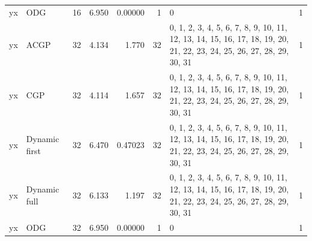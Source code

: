 \documentclass[10pt,a4paper]{article}
\begin{document}
\begin{longtable}{@{}p{23mm}p{29mm}rrrrp{36mm}r@{}}
yx & ODG & 16 & 6.950 & 0.00000 & 1 & 0 & 1 \\
yx & ACGP & 32 & 4.134 & 1.770 & 32 & 0, 1, 2, 3, 4, 5, 6, 7, 8, 9, 10, 11, 12, 13, 14, 15, 16, 17, 18, 19, 20, 21, 22, 23, 24, 25, 26, 27, 28, 29, 30, 31 & 1 \\
yx & CGP & 32 & 4.114 & 1.657 & 32 & 0, 1, 2, 3, 4, 5, 6, 7, 8, 9, 10, 11, 12, 13, 14, 15, 16, 17, 18, 19, 20, 21, 22, 23, 24, 25, 26, 27, 28, 29, 30, 31 & 1 \\
yx & Dynamic first & 32 & 6.470 & 0.47023 & 32 & 0, 1, 2, 3, 4, 5, 6, 7, 8, 9, 10, 11, 12, 13, 14, 15, 16, 17, 18, 19, 20, 21, 22, 23, 24, 25, 26, 27, 28, 29, 30, 31 & 1 \\
yx & Dynamic full & 32 & 6.133 & 1.197 & 32 & 0, 1, 2, 3, 4, 5, 6, 7, 8, 9, 10, 11, 12, 13, 14, 15, 16, 17, 18, 19, 20, 21, 22, 23, 24, 25, 26, 27, 28, 29, 30, 31 & 1 \\
yx & ODG & 32 & 6.950 & 0.00000 & 1 & 0 & 1 \\
\end{longtable}\normalsize\setlength{\tabcolsep}{6pt}
\clearpage
\end{document}
